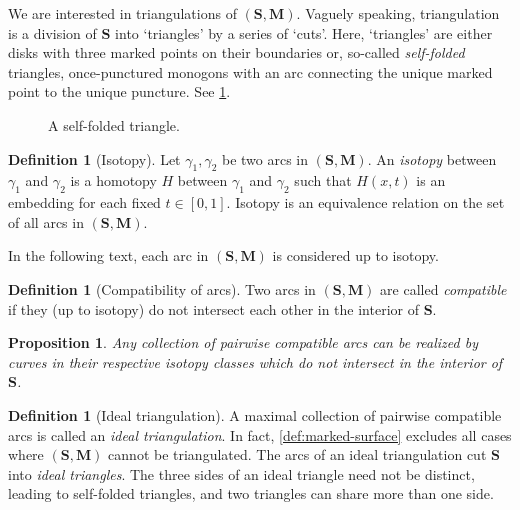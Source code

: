 \documentclass[a4paper,oneside,svgnames,draft]{amsart}
\theoremstyle{plain}
\newtheorem{proposition}[theorem]{Proposition}
\theoremstyle{definition}
\newtheorem{definition}[theorem]{Definition}
\begin{document}
 We are interested in triangulations of $(\mathbf{S},\mathbf{M})$. Vaguely
 speaking, triangulation is a division of $\mathbf{S}$ into `triangles' by a
 series of `cuts'. Here, `triangles' are either disks with three marked points
 on their boundaries or, so-called \emph{self-folded} triangles, once-punctured
 monogons with an arc connecting the unique marked point to the unique puncture.
 See \cref{fig:self-folded-triangle}.
 \begin{figure}[ht]
  \centering

  \caption{A self-folded triangle.}
  \label{fig:self-folded-triangle}
 \end{figure}

 \begin{definition}[Isotopy]
  \label{def:isotopy}
  Let $\gamma_1,\gamma_2$ be two arcs in $(\mathbf{S},\mathbf{M})$. An
  \emph{isotopy} between $\gamma_1$ and $\gamma_2$ is a homotopy $H$ between
  $\gamma_1$ and $\gamma_2$ such that $H(x,t)$ is an embedding for each fixed
  $t \in [0,1]$. Isotopy is an equivalence relation on the set of all arcs in
  $(\mathbf{S},\mathbf{M})$.
 \end{definition}
 In the following text, each arc in $(\mathbf{S},\mathbf{M})$ is considered up
 to isotopy.

 \begin{definition}[Compatibility of arcs]
  \label{def:compatibility-of-arcs}
  Two arcs in $(\mathbf{S},\mathbf{M})$ are called \emph{compatible} if they (up
  to isotopy) do not intersect each other in the interior of $\mathbf{S}$.
 \end{definition}

 \begin{proposition}
  \label{prop:triangulation-up-to-isotopy}
  Any collection of pairwise compatible arcs can be realized by curves in their
  respective isotopy classes which do not intersect in the interior of
  $\mathbf{S}$.
 \end{proposition}

 \begin{definition}[Ideal triangulation]
  \label{def:ideal-triangulation}
  A maximal collection of pairwise compatible arcs is called an \emph{ideal
  triangulation}. In fact, \cref{def:marked-surface} excludes all cases where
  $(\mathbf{S},\mathbf{M})$ cannot be triangulated. The arcs of an ideal
  triangulation cut $\mathbf{S}$ into \emph{ideal triangles}. The three sides of
  an ideal triangle need not be distinct, leading to self-folded triangles, and
  two triangles can share more than one side.
 \end{definition}
\end{document}
